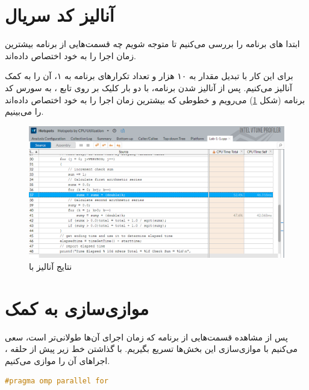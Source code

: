 \documentclass{HW}
\begin{document}
\pagestyle{pages}
\thispagestyle{first_page}

\section{آنالیز کد سریال}

ابتدا های برنامه را بررسی می‌کنیم تا متوجه شویم چه قسمت‌هایی از برنامه بیشترین زمان اجرا را به خود اختصاص داده‌اند.

برای این کار با تبدیل مقدار  به ۱۰ هزار و تعداد تکرارهای برنامه به ۱، آن را به کمک  آنالیز می‌کنیم. پس از آنالیز شدن برنامه، با دو بار کلیک بر روی تابع ، به سورس کد برنامه (شکل \ref{fig:hotspots}) می‌رویم و خطوطی که بیشترین زمان اجرا را به خود اختصاص داده‌اند را می‌بینیم.


\begin{figure}[ht!]
\begin{center}
	\includegraphics[width=15cm]{images/hotspots}
\end{center}
\caption{نتایج آنالیز با }
\label{fig:hotspots}
\end{figure}

\section{موازی‌سازی به کمک }

پس از مشاهده قسمت‌هایی از برنامه که زمان اجرای آن‌ها طولانی‌تر است، سعی می‌کنیم با موازی‌سازی این بخش‌ها تسریع بگیریم. با گذاشتن خط زیر پیش از حلقه ، اجراهای آن را موازی می‌کنیم.

\begin{latin}
\begin{lstlisting}[language=C]
#pragma omp parallel for
\end{lstlisting}
\end{latin}
\end{document}
